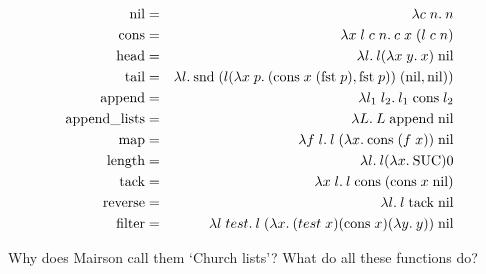 \begin{enumerate}
\begin{eqnarray*}
\mbox{nil}   & = & \lambda c\; n.\: n                                                                                                         \\
\mbox{cons}  & = & \lambda x\; l\; c\; n.\: c\; x\; (l\; c\; n)                                                                               \\
\mbox{head}  & = & \lambda l.\: l (\lambda x\; y.\: x)\; \mbox{nil}                                                                               \\
\mbox{tail}  & = & \lambda l.\: \mbox{snd}\; (l (\lambda x\; p.\: (\mbox{cons}\; x\; (\mbox{fst}\; p),\mbox{fst}\; p))\; (\mbox{nil},\mbox{nil})) \\
\mbox{append}  & = & \lambda l_1\; l_2.\: l_1\; \mbox{cons}\; l_2                                                                             \\
\mbox{append\_lists}  & = & \lambda L.\: L\; \mbox{append}\; \mbox{nil}                                                                       \\
\mbox{map}     & = & \lambda f\; l.\: l\; (\lambda x.\: \mbox{cons}\; (f\; x))\; \mbox{nil}                                                       \\
\mbox{length}  & = & \lambda l.\: l (\lambda x.\: \mbox{SUC}) 0                                                                                   \\
\mbox{tack}  & = & \lambda x\; l.\: l\; \mbox{cons}\; (\mbox{cons}\; x\; \mbox{nil})                                                          \\
\mbox{reverse}  & = & \lambda l.\: l\; \mbox{tack}\; \mbox{nil}                                                                               \\
\mbox{filter}  & = & \lambda l\; test.\: l\; (\lambda x.\: (test\; x) (\mbox{cons}\; x) (\lambda y.\: y))\; \mbox{nil}
\end{eqnarray*}

Why does Mairson call them `Church lists'? What do all these functions do?

\end{enumerate}


